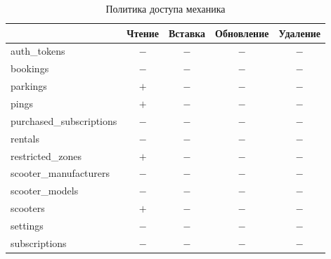 \begin{table}[H]
	\begin{threeparttable}[b]
		\caption{Политика доступа механика}
		\label{tbl:technician-policy}
		{\renewcommand{\arraystretch}{1.2}
			\begin{tabularx}{\textwidth}
				{
					| >{\raggedright\arraybackslash}X
					| >{\centering\arraybackslash}c
					| >{\centering\arraybackslash}c
					| >{\centering\arraybackslash}c
					| >{\centering\arraybackslash}c |
				}
				\hline
				                         & \textbf{Чтение} & \textbf{Вставка} & \textbf{Обновление} & \textbf{Удаление} \\
				\hline
				auth\_tokens             & $-$             & $-$              & $-$                 & $-$               \\
				\hline
				bookings                 & $-$             & $-$              & $-$                 & $-$               \\
				\hline
				parkings                 & $+$             & $-$              & $-$                 & $-$               \\
				\hline
				pings                    & $+$\tnote{1}    & $-$              & $-$                 & $-$               \\
				\hline
				purchased\_subscriptions & $-$             & $-$              & $-$                 & $-$               \\
				\hline
				rentals                  & $-$             & $-$              & $-$                 & $-$               \\
				\hline
				restricted\_zones        & $+$             & $-$              & $-$                 & $-$               \\
				\hline
				scooter\_manufacturers   & $-$             & $-$              & $-$                 & $-$               \\
				\hline
				scooter\_models          & $-$             & $-$              & $-$                 & $-$               \\
				\hline
				scooters                 & $+$             & $-$              & $-$                 & $-$               \\
				\hline
				settings                 & $-$             & $-$              & $-$                 & $-$               \\
				\hline
				subscriptions            & $-$             & $-$              & $-$                 & $-$               \\

\end{tabularx}}
\end{threeparttable}
\end{table}
